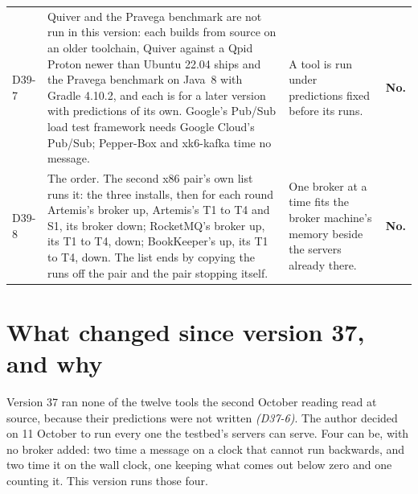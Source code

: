 \documentclass[11pt]{article}
\newcommand{\gl}[1]{{\color{soft}\itshape\small (#1)}}
\begin{document}
{\begin{longtable}{@{}p{1.1cm} >{\raggedright\arraybackslash}p{6.1cm} >{\raggedright\arraybackslash}p{6.0cm} >{\raggedright\arraybackslash}p{2.2cm}@{}}
D39-7 & Quiver and the Pravega benchmark are not run in this version: each builds from source on an older toolchain, Quiver against a Qpid Proton newer than Ubuntu 22.04 ships and the Pravega benchmark on Java~8 with Gradle 4.10.2, and each is for a later version with predictions of its own. Google's Pub/Sub load test framework needs Google Cloud's Pub/Sub; Pepper-Box and xk6-kafka time no message. & A tool is run under predictions fixed before its runs. & \textbf{No.} \\
D39-8 & The order. The second x86 pair's own list runs it: the three installs, then for each round Artemis's broker up, Artemis's T1 to T4 and S1, its broker down; RocketMQ's broker up, its T1 to T4, down; BookKeeper's up, its T1 to T4, down. The list ends by copying the runs off the pair and the pair stopping itself. & One broker at a time fits the broker machine's memory beside the servers already there. & \textbf{No.} \\
\bottomrule
\end{longtable}}

\section*{What changed since version 37, and why}
Version 37 ran none of the twelve tools the second October reading read at source, because their
predictions were not written \gl{D37-6}. The author decided on 11 October to run every one the
testbed's servers can serve. Four can be, with no broker added: two time a message on a clock that
cannot run backwards, and two time it on the wall clock, one keeping what comes out below zero and
one counting it. This version runs those four.
\end{document}
